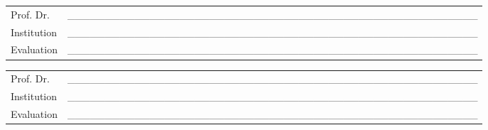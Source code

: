\documentclass[
  12pt,
  a4paper,
  oneside]{tesesusp}
\begin{document}
\begin{folhadeaprovacao}
\vspace*{0.5cm}

\noindent
\begin{tabular}{m{2cm} P{14cm}}
  Prof. Dr. & \_\_\_\_\_\_\_\_\_\_\_\_\_\_\_\_\_\_\_\_\_\_\_\_\_\_\_\_\_\_\_\_\_\_\_\_\_\_\_\_\_\_\_\_\_\_\_\_\_\_\_\_\_\_\_ \\
  Institution & \_\_\_\_\_\_\_\_\_\_\_\_\_\_\_\_\_\_\_\_\_\_\_\_\_\_\_\_\_\_\_\_\_\_\_\_\_\_\_\_\_\_\_\_\_\_\_\_\_\_\_\_\_\_\_ \\
  Evaluation & \_\_\_\_\_\_\_\_\_\_\_\_\_\_\_\_\_\_\_\_\_\_\_\_\_\_\_\_\_\_\_\_\_\_\_\_\_\_\_\_\_\_\_\_\_\_\_\_\_\_\_\_\_\_\_ \\
\end{tabular}

\vspace*{0.5cm}

\noindent
\begin{tabular}{m{2cm} P{14cm}}
  Prof. Dr. & \_\_\_\_\_\_\_\_\_\_\_\_\_\_\_\_\_\_\_\_\_\_\_\_\_\_\_\_\_\_\_\_\_\_\_\_\_\_\_\_\_\_\_\_\_\_\_\_\_\_\_\_\_\_\_ \\
  Institution & \_\_\_\_\_\_\_\_\_\_\_\_\_\_\_\_\_\_\_\_\_\_\_\_\_\_\_\_\_\_\_\_\_\_\_\_\_\_\_\_\_\_\_\_\_\_\_\_\_\_\_\_\_\_\_ \\
  Evaluation & \_\_\_\_\_\_\_\_\_\_\_\_\_\_\_\_\_\_\_\_\_\_\_\_\_\_\_\_\_\_\_\_\_\_\_\_\_\_\_\_\_\_\_\_\_\_\_\_\_\_\_\_\_\_\_ \\
\end{tabular}
\end{folhadeaprovacao}


\begin{dedicatoria}
  \vspace*{\fill}
  \centering
  \noindent
  \textit{
  \lipsum[1]
  }
	\vspace*{\fill}
\end{dedicatoria}


\begin{agradecimentos}
  \noindent
  \lipsum[1]
\end{agradecimentos}
\end{document}
